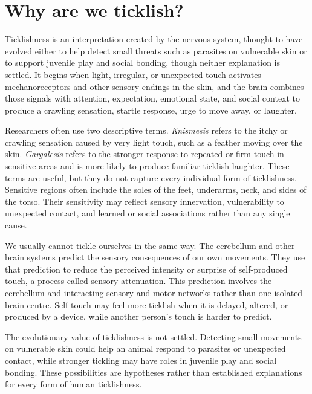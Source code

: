 \documentclass[11pt,oneside]{report}
\begin{document}
\section{Why are we ticklish?}

Ticklishness is an interpretation created by the nervous system, thought to
have evolved either to help detect small threats such as parasites on vulnerable
skin or to support juvenile play and social bonding, though neither explanation
is settled. It begins when light, irregular, or unexpected touch activates
mechanoreceptors and other sensory endings in the skin, and the brain combines
those signals with attention, expectation, emotional state, and social context
to produce a crawling sensation, startle response, urge to move away, or
laughter.

Researchers often use two descriptive terms. \emph{Knismesis} refers to the
itchy or crawling sensation caused by very light touch, such as a feather moving
over the skin. \emph{Gargalesis} refers to the stronger response to repeated or
firm touch in sensitive areas and is more likely to produce familiar ticklish
laughter. These terms are useful, but they do not capture every individual form
of ticklishness. Sensitive regions often include the soles of the feet,
underarms, neck, and sides of the torso. Their sensitivity may reflect sensory
innervation, vulnerability to unexpected contact, and learned or social
associations rather than any single cause.

We usually cannot tickle ourselves in the same way. The cerebellum and other
brain systems predict the sensory consequences of our own movements. They use
that prediction to reduce the perceived intensity or surprise of self-produced
touch, a process called sensory attenuation. This prediction involves the
cerebellum and interacting sensory and motor networks rather than one isolated
brain centre. Self-touch may feel more ticklish when it is delayed, altered, or
produced by a device, while another person's touch is harder to predict.

The evolutionary value of ticklishness is not settled. Detecting small movements
on vulnerable skin could help an animal respond to parasites or unexpected
contact, while stronger tickling may have roles in juvenile play and social
bonding. These possibilities are hypotheses rather than established explanations
for every form of human ticklishness.
\end{document}
